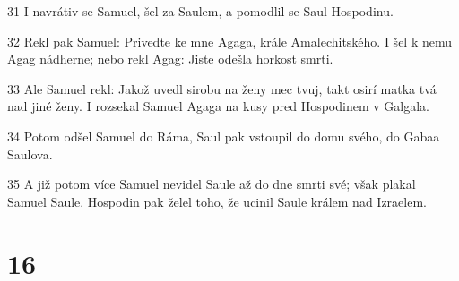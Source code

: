 \par 31 I navrátiv se Samuel, šel za Saulem, a pomodlil se Saul Hospodinu.
\par 32 Rekl pak Samuel: Privedte ke mne Agaga, krále Amalechitského. I šel k nemu Agag nádherne; nebo rekl Agag: Jiste odešla horkost smrti.
\par 33 Ale Samuel rekl: Jakož uvedl sirobu na ženy mec tvuj, takt osirí matka tvá nad jiné ženy. I rozsekal Samuel Agaga na kusy pred Hospodinem v Galgala.
\par 34 Potom odšel Samuel do Ráma, Saul pak vstoupil do domu svého, do Gabaa Saulova.
\par 35 A již potom více Samuel nevidel Saule až do dne smrti své; však plakal Samuel Saule. Hospodin pak želel toho, že ucinil Saule králem nad Izraelem.

\chapter{16}

